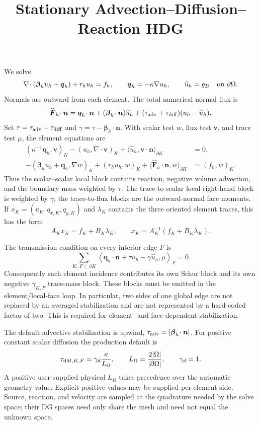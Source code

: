 \documentclass{article}
\newcommand{\uh}{u_h}
\newcommand{\qh}{\boldsymbol q_h}
\newcommand{\bh}{\boldsymbol\beta_h}
\newcommand{\wideh}{\widehat u_h}
\begin{document}
\title{Stationary Advection--Diffusion--Reaction HDG}
\maketitle

We solve
\[
 \nabla\!\cdot(\bh\uh+\qh)+r_h\uh=f_h,
 \qquad \qh=-\kappa\nabla\uh,
 \qquad \wideh=g_D\quad\hbox{on }\partial\Omega .
\]
Normals are outward from each element.  The total numerical normal flux is
\[
 \widehat{\boldsymbol F}_h\!\cdot\boldsymbol n
 =\qh\!\cdot\boldsymbol n+(\bh\!\cdot\boldsymbol n)\wideh
  +(\tau_{\rm adv}+\tau_{\rm diff})(\uh-\wideh).
\]
Set $\tau=\tau_{\rm adv}+\tau_{\rm diff}$ and
$\gamma=\tau-\bh\!\cdot\boldsymbol n$.  With scalar test $w$, flux test
$\boldsymbol v$, and trace test $\mu$, the element equations are
\begin{align*}
 (\kappa^{-1}\qh,\boldsymbol v)_K-(\uh,\nabla\!\cdot\boldsymbol v)_K
       +\langle\wideh,\boldsymbol v\!\cdot\boldsymbol n\rangle_{\partial K}&=0,\\
 -(\bh\uh+\qh,\nabla w)_K+(r_h\uh,w)_K
       +\langle\widehat{\boldsymbol F}_h\!\cdot\boldsymbol n,w\rangle_{\partial K}
       &=(f_h,w)_K.
\end{align*}
Thus the scalar--scalar local block contains reaction, negative volume
advection, and the boundary mass weighted by $\tau$.  The trace-to-scalar
local right-hand block is weighted by $\gamma$; the trace-to-flux blocks are
the outward-normal face moments.  If $x_K=(u_K,q_{x,K},q_{y,K})$ and $\lambda_K$
contains the three oriented element traces, this has the form
\[
 A_Kx_K=f_K+B_K\lambda_K,
 \qquad x_K=A_K^{-1}(f_K+B_K\lambda_K).
\]

The transmission condition on every interior edge $F$ is
\[
 \sum_{K:\,F\subset\partial K}
 \left\langle
   \qh\!\cdot\boldsymbol n+\tau\uh-\gamma\wideh,\mu
 \right\rangle_F=0.
\]
Consequently each element incidence contributes its own Schur block and its
own negative $\gamma_{K,F}$ trace-mass block.  These blocks must be emitted in
the element/local-face loop.  In particular, two sides of one global edge are
not replaced by an averaged stabilization and are not represented by a
hard-coded factor of two.  This is required for element- and face-dependent
stabilization.

The default advective stabilization is upwind,
$\tau_{\rm adv}=|\bh\!\cdot\boldsymbol n|$.  For positive constant scalar
diffusion the production default is
\[
 \tau_{{\rm diff},K,F}=\gamma_d\frac{\kappa}{L_\Omega},
 \qquad L_\Omega=\frac{2|\Omega|}{|\partial\Omega|},\qquad \gamma_d=1.
\]
A positive user-supplied physical $L_\Omega$ takes precedence over the
automatic geometry value.  Explicit positive values may be supplied per
element side.  Source, reaction,
and velocity are sampled at the quadrature needed by the solve space; their DG
spaces need only share the mesh and need not equal the unknown space.
\end{document}
